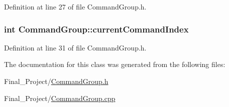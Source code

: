 Definition at line 27 of file Command\-Group.\-h.

\hypertarget{classCommandGroup_aeb8729b909aafeb23eafcfd0eec22c71}{
\subsubsection[{current\-Command\-Index}]{\setlength{\rightskip}{0pt plus 5cm}int Command\-Group\-::current\-Command\-Index\hspace{0.3cm}{\ttfamily [private]}}}\label{classCommandGroup_aeb8729b909aafeb23eafcfd0eec22c71}


Definition at line 31 of file Command\-Group.\-h.



The documentation for this class was generated from the following files\-:\begin{DoxyCompactItemize}
\item 
Final\-\_\-\-Project/\hyperlink{CommandGroup_8h}{Command\-Group.\-h}\item 
Final\-\_\-\-Project/\hyperlink{CommandGroup_8cpp}{Command\-Group.\-cpp}\end{DoxyCompactItemize}
